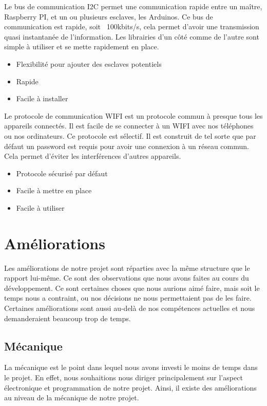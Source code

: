 \documentclass[
	a4paper,									%
	11pt,										%
	twoside,									%
	openright,									%
	notitlepage,									%
	parskip=half,								%
]{scrreprt}										%
\begin{document}
Le bus de communication I2C permet une communication rapide entre un maître, Raspberry PI, et un ou plusieurs esclaves, les Arduinos. 
Ce bus de communication est rapide, soit ~100kbits/s, cela permet d'avoir une transmission quasi instantanée de l'information.
Les librairies d'un côté comme de l'autre sont simple à utiliser et se mette rapidement en place. 

\newpage
\begin{itemize}
	\item Flexibilité pour ajouter des esclaves potentiels
	\item Rapide
	\item Facile à installer
\end{itemize}

Le protocole de communication WIFI est un protocole commun à presque tous les appareils connectés. Il est facile de se connecter 
à un WIFI avec nos téléphones ou nos ordinateurs. Ce protocole est sélectif. Il est construit de tel sorte que par défaut un 
password est requis pour avoir une connexion à un réseau commun. Cela permet d'éviter les interférences d'autres appareils. 

\begin{itemize}
	\item Protocole sécurisé par défaut 
	\item Facile à mettre en place
	\item Facile à utiliser
\end{itemize}

\chapter{Améliorations}

Les améliorations de notre projet sont réparties avec la même structure que le rapport lui-même. 
Ce sont des observations que nous avons faites au cours du développement. Ce sont certaines 
choses que nous aurions aimé faire, mais soit le temps nous a contraint, ou nos décisions 
ne nous permettaient pas de les faire. Certaines améliorations sont aussi au-delà de nos 
compétences actuelles et nous demanderaient beaucoup trop de temps. \par

\section{Mécanique}

La mécanique est le point dans lequel nous avons investi le moins de temps dans le projet. 
En effet, nous souhaitions nous diriger principalement sur l'aspect électronique et programmation
de notre projet. Ainsi, il existe des améliorations au niveau de la mécanique de notre projet. \par
\end{document}
